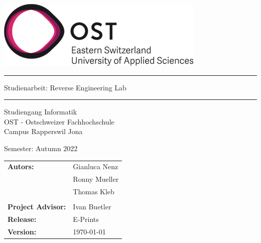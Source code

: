 \begin{titlepage}

    \begin{center}

        \includegraphics[height=0.15\textwidth, right]{resources/ost-logo.png}

        \vspace{1 cm}

        \par\noindent\rule{\textwidth}{0.6pt}

        \vspace{0.5cm}

        {\Huge Studienarbeit: Reverse Engineering Lab}

        \vspace{0.5cm}

        \par\noindent\rule{\textwidth}{0.6pt}

        \vspace{1 cm}

        Studiengang Informatik \\
        OST - Ostschweizer Fachhochschule \\
        Campus Rapperswil Jona \\

        \vspace{1 cm}

        Semester: Autumn 2022

        \vspace{1 cm}
        
        \begin{table}[h!]
            \centering
            \begin{tabular}{@{}ll}
                \textbf{Autors:}    & Gianluca Nenz \\
                                          & Ronny Mueller \\
                                          & Thomas Kleb \\
                                          &                    \\
                \textbf{Project Advisor:} & Ivan Buetler \\
                \textbf{Release:} & E-Prints \\
                \textbf{Version:} & \today
            \end{tabular}
        \end{table}
        


\end{center}
\end{titlepage}
